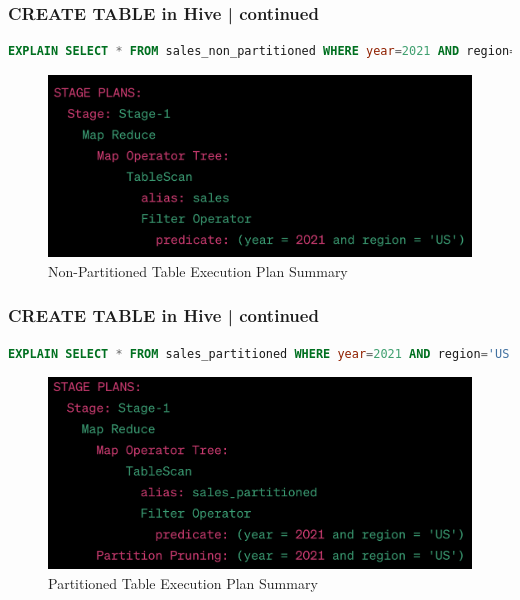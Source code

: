 \begin{frame}[fragile]
	\frametitle{CREATE TABLE in Hive | continued}
	\vspace{-0.6cm}
	\begin{tcolorbox}[colback=white,colframe=black,title= Part 5: Table Partitions]
	\small
	\vspace{-0.3cm}
\begin{lstlisting}[caption={Explain Plan Command for Non-Partitioned Table },language=SQL]
EXPLAIN SELECT * FROM sales_non_partitioned WHERE year=2021 AND region='US';
\end{lstlisting}
	\vspace{-0.5cm}
	\begin{figure}
		\includegraphics[width=.7\textwidth,height=\textheight,keepaspectratio]{./Figures/chapter-03/non_partitioned_explain.png}
		\caption{Non-Partitioned Table Execution Plan Summary}	
	\end{figure}
\end{tcolorbox}
	
\end{frame}
\begin{frame}[fragile]
	\frametitle{CREATE TABLE in Hive | continued}
	\vspace{-0.6cm}
	\begin{tcolorbox}[colback=white,colframe=black,title= Part 5: Table Partitions]
	\small
	\vspace{-0.3cm}
\begin{lstlisting}[caption={Explain Plan Command for Partitioned Table},language=SQL]
EXPLAIN SELECT * FROM sales_partitioned WHERE year=2021 AND region='US';
\end{lstlisting}
	\vspace{-0.5cm}
	\begin{figure}
	\includegraphics[width=.7\textwidth,height=\textheight,keepaspectratio]{./Figures/chapter-03/partitioned_explain.png}
\caption{Partitioned Table Execution Plan Summary}	
\end{figure}
\end{tcolorbox}
	
\end{frame}
